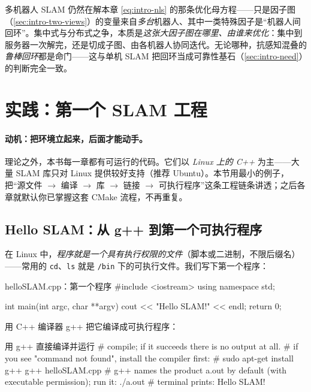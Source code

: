 \begin{insight}
多机器人 SLAM 仍然在解本章 \cref{eq:intro-nls} 的那条优化母方程——只是因子图（\cref{sec:intro-two-views}）的变量来自\emph{多台}机器人、其中一类特殊因子是“机器人间回环”。集中式与分布式之争，本质是\emph{这张大因子图在哪里、由谁来优化}：集中到服务器一次解完，还是切成子图、由各机器人协同迭代。无论哪种，抗感知混叠的\emph{鲁棒回环}都是命门——这与单机 SLAM 把回环当成可靠性基石（\cref{sec:intro-need}）的判断完全一致。
\end{insight}

\section{实践：第一个 SLAM 工程}
\label{sec:intro-code}

\paragraph{动机：把环境立起来，后面才能动手。}
理论之外，本书每一章都有可运行的代码。它们以 \emph{Linux 上的 C++} 为主——大量 SLAM 库只对 Linux 提供较好支持（推荐 Ubuntu）。本节用最小的例子，把“源文件 $\to$ 编译 $\to$ 库 $\to$ 链接 $\to$ 可执行程序”这条工程链条讲透；之后各章就默认你已掌握这套 CMake 流程，不再重复。

\subsection{Hello SLAM：从 g++ 到第一个可执行程序}
\label{sec:intro-hello}
在 Linux 中，\emph{程序就是一个具有执行权限的文件}（脚本或二进制，不限后缀名）——常用的 \texttt{cd}、\texttt{ls} 就是 \texttt{/bin} 下的可执行文件。我们写下第一个程序：

\begin{codebox}[C++]{helloSLAM.cpp：第一个程序}
#include <iostream>
using namespace std;

int main(int argc, char **argv) {
    cout << "Hello SLAM!" << endl;
    return 0;
}
\end{codebox}

\noindent 用 C++ 编译器 g++ 把它编译成可执行程序：

\begin{codebox}[bash]{用 g++ 直接编译并运行}
# compile; if it succeeds there is no output at all.
# if you see "command not found", install the compiler first:
#   sudo apt-get install g++
g++ helloSLAM.cpp
# g++ names the product a.out by default (with executable permission); run it:
./a.out
# terminal prints: Hello SLAM!
\end{codebox}

